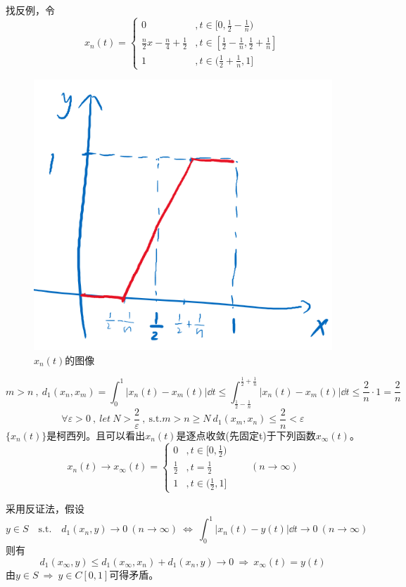 找反例，令
\[x_n(t)=\left \{
\begin{array}{ll}
    0 & ,t \in [0,\frac{1}{2}-\frac{1}{n}) \\
    \frac{n}{2}x-\frac{n}{4}+\frac{1}{2} & ,t \in [\frac{1}{2}-\frac{1}{n},\frac{1}{2}+\frac{1}{n}] \\
    1 & ,t \in (\frac{1}{2}+\frac{1}{n},1]
\end{array}
\right .\]
\begin{figure}[htbp]
    \center
    \includegraphics[scale=0.4]{./fig/2.1.4_1.png}
    \caption{$x_n(t)$的图像}
\end{figure}
\[m>n \ , \ d_1(x_n,x_m)=\int_0^1|x_n(t)-x_m(t)|\dd t \leq \int_{\frac{1}{2}-\frac{1}{n}}^{\frac{1}{2}+\frac{1}{n}}|x_n(t)-x_m(t)|\dd t \leq \frac{2}{n} \cdot 1=\frac{2}{n}\]
\[\forall \varepsilon>0 \ , \ let \ N>\frac{2}{\varepsilon} \ , \ \text{s.t.} m>n \geq N \ d_1(x_m,x_n) \leq \frac{2}{n} < \varepsilon\]
$\{x_n(t)\}$是柯西列。且可以看出$x_n(t)$是逐点收敛(先固定t)于下列函数$x_{\infty}(t)$。
\[x_n(t) \rightarrow x_{\infty}(t)=\left \{
\begin{array}{ll}
    0 & ,t \in [0,\frac{1}{2}) \\
    \frac{1}{2} & ,t=\frac{1}{2} \\
    1 & ,t \in (\frac{1}{2},1]
\end{array}
\right . \qquad (n \rightarrow \infty)\]

采用反证法，假设
\[y \in S \quad \text{s.t.} \quad d_1(x_n,y) \rightarrow 0 \ (n \rightarrow \infty) \ \Leftrightarrow \ \int_0^1|x_n(t)-y(t)|\dd t \rightarrow 0 \ (n \rightarrow \infty)\]
则有
\[d_1(x_{\infty},y) \leq d_1(x_{\infty},x_n)+d_1(x_n,y) \rightarrow 0 \ \Rightarrow \ x_{\infty}(t)=y(t)\]
由$y \in S \ \Rightarrow \ y \in C[0,1]$可得矛盾。

